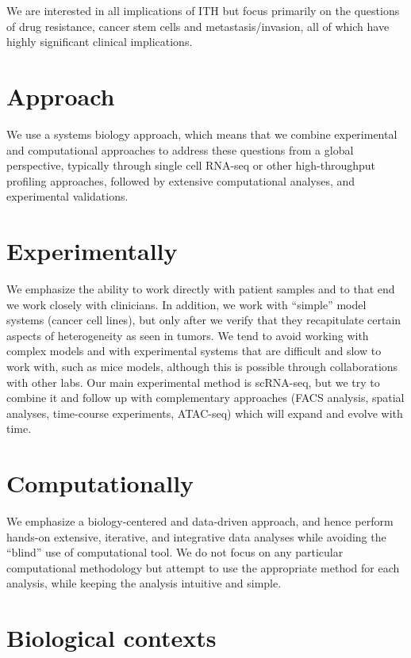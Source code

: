 \documentclass[]{book}
\begin{document}
We are interested in all implications of ITH but focus primarily on the
questions of drug resistance, cancer stem cells and metastasis/invasion,
all of which have highly significant clinical implications.

\section{Approach}\label{approach}

We use a systems biology approach, which means that we combine
experimental and computational approaches to address these questions
from a global perspective, typically through single cell RNA-seq or
other high-throughput profiling approaches, followed by extensive
computational analyses, and experimental validations.

\section{Experimentally}\label{experimentally}

We emphasize the ability to work directly with patient samples and to
that end we work closely with clinicians. In addition, we work with
``simple'' model systems (cancer cell lines), but only after we verify
that they recapitulate certain aspects of heterogeneity as seen in
tumors. We tend to avoid working with complex models and with
experimental systems that are difficult and slow to work with, such as
mice models, although this is possible through collaborations with other
labs. Our main experimental method is scRNA-seq, but we try to combine
it and follow up with complementary approaches (FACS analysis, spatial
analyses, time-course experiments, ATAC-seq) which will expand and
evolve with time.

\section{Computationally}\label{computationally}

We emphasize a biology-centered and data-driven approach, and hence
perform hands-on extensive, iterative, and integrative data analyses
while avoiding the ``blind'' use of computational tool. We do not focus
on any particular computational methodology but attempt to use the
appropriate method for each analysis, while keeping the analysis
intuitive and simple.

\section{Biological contexts}\label{biological-contexts}
\end{document}
